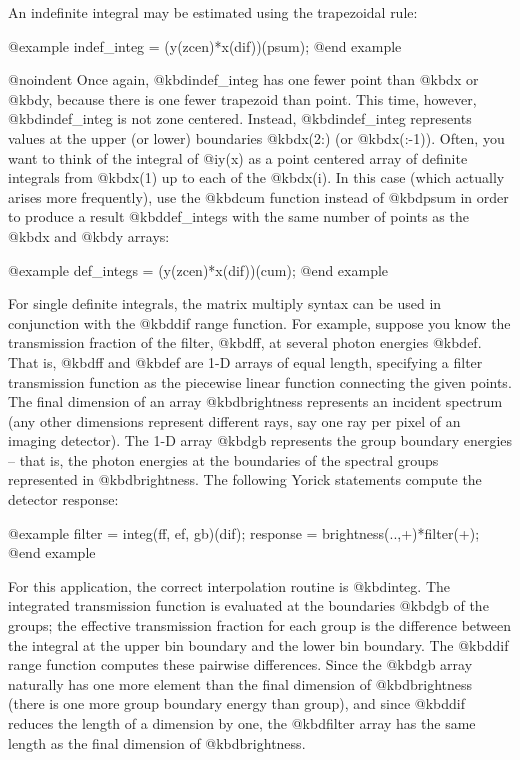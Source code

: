 An indefinite integral may be estimated using the trapezoidal rule:

@example
indef_integ = (y(zcen)*x(dif))(psum);
@end example

@noindent
Once again, @kbd{indef_integ} has one fewer point than @kbd{x} or
@kbd{y}, because there is one fewer trapezoid than point.  This time,
however, @kbd{indef_integ} is not zone centered.  Instead,
@kbd{indef_integ} represents values at the upper (or lower) boundaries
@kbd{x(2:)} (or @kbd{x(:-1)}).  Often, you want to think of the integral
of @i{y(x)} as a point centered array of definite integrals from
@kbd{x(1)} up to each of the @kbd{x(i)}.  In this case (which actually
arises more frequently), use the @kbd{cum} function instead of
@kbd{psum} in order to produce a result @kbd{def_integs} with the same
number of points as the @kbd{x} and @kbd{y} arrays:

@example
def_integs = (y(zcen)*x(dif))(cum);
@end example

For single definite integrals, the matrix multiply syntax can be used in
conjunction with the @kbd{dif} range function.  For example, suppose you
know the transmission fraction of the filter, @kbd{ff}, at several
photon energies @kbd{ef}.  That is, @kbd{ff} and @kbd{ef} are 1-D arrays
of equal length, specifying a filter transmission function as the
piecewise linear function connecting the given points.  The final
dimension of an array @kbd{brightness} represents an incident spectrum
(any other dimensions represent different rays, say one ray per pixel of
an imaging detector).  The 1-D array @kbd{gb} represents the group
boundary energies -- that is, the photon energies at the boundaries of
the spectral groups represented in @kbd{brightness}.  The following
Yorick statements compute the detector response:

@example
filter = integ(ff, ef, gb)(dif);
response = brightness(..,+)*filter(+);
@end example

For this application, the correct interpolation routine is @kbd{integ}.
The integrated transmission function is evaluated at the boundaries
@kbd{gb} of the groups; the effective transmission fraction for each
group is the difference between the integral at the upper bin boundary
and the lower bin boundary.  The @kbd{dif} range function computes these
pairwise differences.  Since the @kbd{gb} array naturally has one more
element than the final dimension of @kbd{brightness} (there is one more
group boundary energy than group), and since @kbd{dif} reduces the
length of a dimension by one, the @kbd{filter} array has the same length
as the final dimension of @kbd{brightness}.

